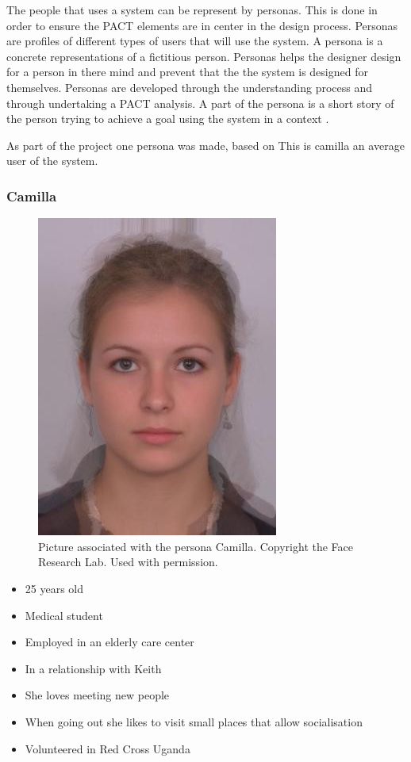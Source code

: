 The people that uses a system can be represent by personas. This is done in order to ensure the PACT elements are in center in the design process. Personas are profiles of different types of users that will use the system. A persona is a concrete representations of a fictitious person. Personas helps the designer design for a person in there mind and prevent that the the system is designed for themselves. Personas are developed through the understanding process and through undertaking a PACT analysis. A part of the persona is a short story of the person trying to achieve a goal using the system in a context \cite{benyon2013designing}.

As part of the project one persona was made, based on %
This is camilla an average user of the system.

\subsubsection{Camilla}
\begin{figure} [h]
  \centering
  \includegraphics[]{Images/average.jpg}
  \caption{Picture associated with the persona Camilla. Copyright the Face Research Lab. Used with permission.}
  \label{fig:camilla}
\end{figure}
\begin{itemize}
\item 25 years old
\item Medical student
\item Employed in an elderly care center
\item In a relationship with Keith
\item She loves meeting new people
\item When going out she likes to visit small places that allow socialisation
\item Volunteered in Red Cross Uganda
\end{itemize}

